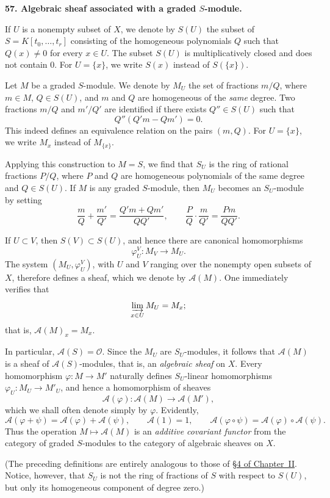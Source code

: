 
\label{fac:III:2:no:57}
\textbf{57. Algebraic sheaf associated with a graded $S$-module.}

\label{fac:III:2:no:57:def:S-U}
If $U$ is a nonempty subset of $X$, we denote by $S(U)$ the subset of
$S=K[t_0,\ldots,t_r]$ consisting of the homogeneous polynomials $Q$ such
that $Q(x)\neq0$ for every $x\in U$. The subset $S(U)$ is multiplicatively closed
and does not contain $0$. For $U=\{x\}$, we write $S(x)$ instead of
$S(\{x\})$.

\label{fac:III:2:no:57:def:M-U}
Let $M$ be a graded $S$-module. We denote by $M_U$ the set of fractions
$m/Q$, where $m\in M$, $Q\in S(U)$, and $m$ and $Q$ are homogeneous of the
\textit{same} degree. Two fractions $m/Q$ and $m'/Q'$ are identified if
there exists $Q''\in S(U)$ such that
\label{fac:III:2:no:57:formula:equivalence}
\[
Q''(Q'm-Qm')=0.
\]
This indeed defines an equivalence relation on the pairs $(m,Q)$. For
$U=\{x\}$, we write $M_x$ instead of $M_{\{x\}}$.

Applying this construction to $M=S$, we find that $S_U$ is the ring of
rational fractions $P/Q$, where $P$ and $Q$ are homogeneous polynomials of
the same degree and $Q\in S(U)$. If $M$ is any graded $S$-module, then
$M_U$ becomes an $S_U$-module by setting
\label{fac:III:2:no:57:formula:module-operations}
\[
\frac{m}{Q}+\frac{m'}{Q'}=\frac{Q'm+Qm'}{QQ'},
\qquad
\frac{P}{Q}\cdot\frac{m}{Q'}=\frac{Pm}{QQ'}.
\]

If $U\subset V$, then $S(V)\subset S(U)$, and hence there are canonical
homomorphisms
\label{fac:III:2:no:57:formula:transition}
\[
\varphi_U^V:M_V\longrightarrow M_U.
\]
\label{fac:III:2:no:57:construction:A}
The system $(M_U,\varphi_U^V)$, with $U$ and $V$ ranging over the nonempty
open subsets of $X$, therefore defines a sheaf, which we denote by
$\mathcal{A}(M)$. One immediately verifies that
\label{fac:III:2:no:57:formula:stalk}
\[
\varinjlim_{x\in U}M_U=M_x;
\]
that is, $\mathcal{A}(M)_x=M_x$.

In particular, $\mathcal{A}(S)=\mathcal{O}$. Since the $M_U$ are
$S_U$-modules, it follows that $\mathcal{A}(M)$ is a sheaf of
$\mathcal{A}(S)$-modules, that is, an \textit{algebraic sheaf} on $X$.
Every homomorphism $\varphi:M\to M'$ naturally defines $S_U$-linear
homomorphisms $\varphi_U:M_U\to M'_U$, and hence a homomorphism of sheaves
\[
\mathcal{A}(\varphi):\mathcal{A}(M)\longrightarrow\mathcal{A}(M'),
\]
which we shall often denote simply by $\varphi$. Evidently,
\label{fac:III:2:no:57:formula:functoriality}
\[
\mathcal{A}(\varphi+\psi)=\mathcal{A}(\varphi)+\mathcal{A}(\psi),
\qquad
\mathcal{A}(1)=1,
\qquad
\mathcal{A}(\varphi\circ\psi)
=\mathcal{A}(\varphi)\circ\mathcal{A}(\psi).
\]
Thus the operation $M\mapsto\mathcal{A}(M)$ is an \textit{additive covariant functor}
from the category of graded $S$-modules to the category
of algebraic sheaves on $X$.

(The preceding definitions are entirely analogous to those of
\hyperref[fac:II:4]{§4 of Chapter~II}. Notice, however, that $S_U$ is not
the ring of fractions of $S$ with respect to $S(U)$, but only its
homogeneous component of degree zero.)
